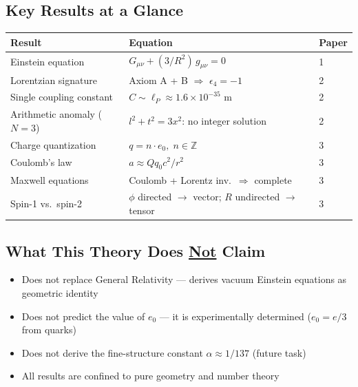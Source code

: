 \documentclass[11pt,a4paper]{article}
\begin{document}
\vspace{8pt}

\subsection*{Key Results at a Glance}

\vspace{-2pt}
\begin{center}
\begin{tabular}{lll}
\toprule
\textbf{Result} & \textbf{Equation} & \textbf{Paper} \\
\midrule
Einstein equation & $G_{\mu\nu} + (3/R^2)\,g_{\mu\nu} = 0$ & 1 \\
Lorentzian signature & Axiom A + B $\Rightarrow$ $\epsilon_4 = -1$ & 2 \\
Single coupling constant & $C \sim \ell_P \approx 1.6 \times 10^{-35}$ m & 2 \\
Arithmetic anomaly ($N\!=\!3$) & $l^2 + t^2 = 3x^2$: no integer solution & 2 \\
Charge quantization & $q = n \cdot e_0,\; n \in \mathbb{Z}$ & 3 \\
Coulomb's law & $a \approx Qq_0 c^2 / r^2$ & 3 \\
Maxwell equations & Coulomb + Lorentz inv.\ $\Rightarrow$ complete & 3 \\
Spin-1 vs.\ spin-2 & $\phi$ directed $\to$ vector; $R$ undirected $\to$ tensor & 3 \\
\bottomrule
\end{tabular}
\end{center}

\vspace{8pt}

\subsection*{What This Theory Does \underline{Not} Claim}

\vspace{-2pt}
\begin{itemize}
\item Does not replace General Relativity --- derives vacuum Einstein equations as geometric identity
\item Does not predict the value of $e_0$ --- it is experimentally determined ($e_0 = e/3$ from quarks)
\item Does not derive the fine-structure constant $\alpha \approx 1/137$ (future task)
\item All results are confined to pure geometry and number theory
\end{itemize}
\end{document}
